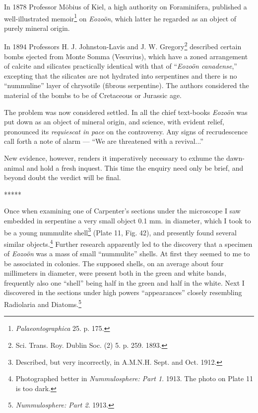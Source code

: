 \documentclass[a4paper, 12pt, oneside]{article}
\begin{document}
In 1878 Professor Möbius of Kiel, a high authority on Foraminifera, published a well-illustrated memoir\footnote{\emph{Palaeontographica} 25. p. 175.} on \emph{Eozoön}, which latter he regarded as an object of purely mineral origin.

In 1894 Professors H. J. Johnston-Lavis and J. W. Gregory\footnote{Sci. Trans. Roy. Dublin Soc. (2) 5. p. 259. 1893.} described certain bombs ejected from Monte Somma (Vesuvius), which have a zoned arrangement of calcite and silicates practically identical with that of ``\emph{Eozoön canadense},'' excepting that the silicates are not hydrated into serpentines and there is no ``nummuline'' layer of chrysotile (fibrous serpentine). The authors considered the material of the bombs to be of Cretaceous or Jurassic age.

The problem was now considered settled. In all the chief text-books \emph{Eozoön} was put down as an object of mineral origin, and science, with evident relief, pronounced its \emph{requiescat in pace} on the controversy. Any signs of recrudescence call forth a note of alarm --- ``We are threatened with a revival...''

New evidence, however, renders it imperatively necessary to exhume the dawn-animal and hold a fresh inquest. This time the enquiry need only be brief, and beyond doubt the verdict will be final.

\centerline{*\hspace{15mm}*\hspace{15mm}*\hspace{15mm}*\hspace{15mm}*}
\bigskip

Once when examining one of Carpenter's sections under the microscope I saw embedded in serpentine a very small object 0.1 mm. in diameter, which I took to be a young nummulite shell\footnote{Described, but very incorrectly, in A.M.N.H. Sept. and Oct. 1912.} (Plate 11, Fig. 42), and presently found several similar objects.\footnote{Photographed better in \emph{Nummulosphere: Part 1}. 1913. The photo on Plate 11 is too dark.} Further research apparently led to the discovery that a specimen of \emph{Eozoön} was a mass of small ``nummulite'' shells. At first they seemed to me to be associated in colonies. The supposed shells, on an average about four millimeters in diameter, were present both in the green and white bands, frequently also one ``shell'' being half in the green and half in the white. Next I discovered in the sections under high powers ``appearances'' closely resembling Radiolaria and Diatoms.\footnote{\emph{Nummulosphere: Part 2}. 1913.}
\end{document}

